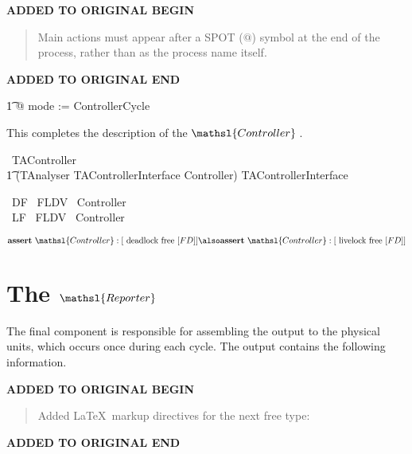 \documentclass{report}
\renewcommand{\freetype}[1]{\mathsf{#1}}
\newcommand{\freetypecloseValve}{\freetype{closeValve}}
\newcommand{\freetypeinitialisation}{\freetype{initialisation}}
\newcommand{\freetypelevelFailureDetection}{\freetype{levelFailureDetection}}
\newcommand{\freetypelevelRepairedAcknowledgement}%
  {\freetype{levelRepairedAcknowledgement}}
\newcommand{\freetypeopenValve}{\freetype{openValve}}
\newcommand{\freetypeprogramReady}{\freetype{programReady}}
\newcommand{\freetypesteamFailureDetection}{\freetype{steamFailureDetection}}
\newcommand{\freetypesteamRepairedAcknowledgement}%
  {\freetype{steamRepairedAcknowledgement}}
\newenvironment{addedstuff}{\begin{flushleft}\textbf{ADDED TO ORIGINAL BEGIN}\begin{quote}\begin{minipage}{.8\textwidth}}{\end{minipage}\end{quote}\textbf{ADDED TO ORIGINAL END}\end{flushleft}}
\begin{document}
\begin{addedstuff}
   Main actions must appear after a SPOT ($@$) symbol at the end of the process,
   rather than as the process name itself.
\end{addedstuff}

\begin{circusaction}
   \t1 @ mode := \freetypeinitialisation \circseq ControllerCycle \\
\end{circusaction}

This completes the description of the \( \mathsl{Controller} \, \).

\begin{circus}
   \circend
\end{circus}

\begin{circus}
   \circprocess\ TAController \circdef \\
    \t1 (TAnalyser \lpar TAControllerInterface \rpar Controller) \circhide TAControllerInterface
\end{circus}

\begin{circus}
   \circassertref\ DF \circrefines\ FLDV~ Controller \\
   \circassertref\ LF \circrefines\ FLDV~ Controller \\
\end{circus}
\[
  \mathbf{assert}\ \mathsl{Controller} :[ \hbox{ deadlock free } [FD] ] %
  \also %
  \mathbf{assert}\ \mathsl{Controller} :[ \hbox{ livelock free } [FD] ]
\]


\chapter{The $\mathsl{Reporter}$}

The final component is responsible for assembling the output to the
physical units, which occurs once during each cycle.  The output
contains the following information.

\begin{addedstuff}
Added \LaTeX\ markup directives for the next free type:
\end{addedstuff}
\end{document}
